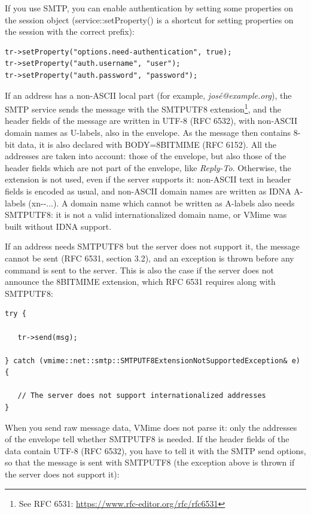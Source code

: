 If you use SMTP, you can enable authentication by setting some properties
on the session object ({\vcode service::setProperty()} is a shortcut for
setting properties on the session with the correct prefix):

\begin{lstlisting}
tr->setProperty("options.need-authentication", true);
tr->setProperty("auth.username", "user");
tr->setProperty("auth.password", "password");
\end{lstlisting}

If an address has a non-ASCII local part (for example, \emph{josé@example.org}),
the SMTP service sends the message with the SMTPUTF8
extension\footnote{See RFC 6531: \url{https://www.rfc-editor.org/rfc/rfc6531}},
and the header fields of the message are written in UTF-8 (RFC 6532), with
non-ASCII domain names as U-labels, also in the envelope. As the
message then contains 8-bit data, it is also declared with {\vcode BODY=8BITMIME}
(RFC 6152). All the addresses are taken into account: those of the envelope,
but also those of the header fields which are not part of the envelope, like
\emph{Reply-To}.
Otherwise, the extension is not used, even if the server supports it:
non-ASCII text in header fields is encoded as usual, and non-ASCII domain
names are written as IDNA A-labels ({\vcode xn-{}-...}). A domain name which
cannot be written as A-labels also needs SMTPUTF8: it is not a valid
internationalized domain name, or VMime was built without IDNA support.

If an address needs SMTPUTF8 but the server does not support it, the message
cannot be sent (RFC 6531, section 3.2), and an exception is thrown before any
command is sent to the server. This is also the case if the server does not
announce the 8BITMIME extension, which RFC 6531 requires along with SMTPUTF8:

\begin{lstlisting}
try {

   tr->send(msg);

} catch (vmime::net::smtp::SMTPUTF8ExtensionNotSupportedException& e) {

   // The server does not support internationalized addresses
}
\end{lstlisting}

When you send raw message data, VMime does not parse it: only the addresses of
the envelope tell whether SMTPUTF8 is needed. If the header fields of the data
contain UTF-8 (RFC 6532), you have to tell it with the SMTP send options, so
that the message is sent with SMTPUTF8 (the exception above is thrown if the
server does not support it):

